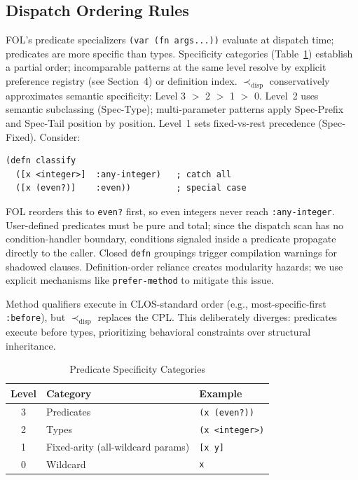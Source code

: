 \documentclass[sigconf,nonacm]{acmart}
\begin{document}
\subsection{Dispatch Ordering Rules}
FOL's predicate specializers \texttt{(var (fn args...))} evaluate at dispatch time; predicates are more specific than types. 
Specificity categories (Table~\ref{tab:specificity}) establish a partial order; incomparable patterns at the same level resolve by explicit preference registry (see Section~4) or definition index.
$\prec_{\text{disp}}$ conservatively approximates semantic specificity: Level 3 $>$ 2 $>$ 1 $>$ 0.
Level~2 uses semantic subclassing (Spec-Type); multi-parameter patterns apply Spec-Prefix and Spec-Tail position by position. Level~1 sets fixed-vs-rest precedence (Spec-Fixed).
Consider:
\begin{lstlisting}
(defn classify
  ([x <integer>]  :any-integer)   ; catch all
  ([x (even?)]    :even))         ; special case
\end{lstlisting}
FOL reorders this to \texttt{even?} first, so even integers never reach \texttt{:any-integer}.
User-defined predicates must be pure and total; since the dispatch scan has no condition-handler boundary, conditions signaled inside a predicate propagate directly to the caller.
Closed \texttt{defn} groupings trigger compilation warnings for shadowed clauses.
Definition-order reliance creates modularity hazards; we use explicit mechanisms like \texttt{prefer-method} to mitigate this issue.

Method qualifiers execute in CLOS-standard order (e.g., most-specific-first \texttt{:before}),
but $\prec_{\text{disp}}$ replaces the CPL. This deliberately diverges:
predicates execute before types, prioritizing behavioral constraints over structural inheritance.

\begin{table}[htbp]
\centering
\caption{Predicate Specificity Categories}
\label{tab:specificity}
\small
\begin{tabular}{cll}
\toprule
\textbf{Level} & \textbf{Category} & \textbf{Example} \\
\midrule
3 & Predicates & \texttt{(x (even?))} \\
2 & Types & \texttt{(x <integer>)} \\
1 & Fixed-arity (all-wildcard params) & \texttt{[x y]} \\
0 & Wildcard & \texttt{x} \\
\bottomrule
\end{tabular}
\end{table}
\end{document}
